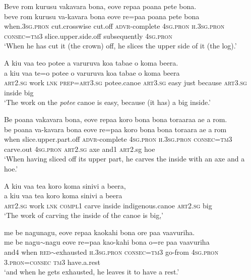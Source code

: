 \ea\label{ex:text18-9}
Beve rom kurusu vakavara bona, eove repaa poana pete bona.\\
\gll beve	rom	kurusu	va-kavara	bona	eove	re=paa	poana	pete	bona\\
     when.3\textsc{sg}.\textsc{pron}	cut.crosswise	cut.off	\textsc{advr}-complete	4\textsc{sg}.\textsc{pron}	\textsc{h}.3\textsc{sg}.\textsc{pron}	\textsc{consec}=\textsc{tm}3	slice.upper.side.off	subsequently	4\textsc{sg}.\textsc{pron}\\
\glt `When he has cut it (the crown) off, he slices the upper side of it (the log).'
\z

\ea\label{ex:text18-10}
A kiu vaa teo potee a varuruva koa tabae o koma beera.\\
\gll a	kiu	vaa	te=o	potee	o	varuruva	koa	tabae	o	koma	beera\\
     \textsc{art}2.\textsc{sg}	work	\textsc{lnk}	\textsc{prep}=\textsc{art}3.\textsc{sg}	potee.canoe	\textsc{art}3.\textsc{sg}	easy	just	because	\textsc{art}3.\textsc{sg}	inside	big\\
\glt `The work on the \textit{potee} canoe is easy, because (it has) a big inside.'
\z

\ea\label{ex:text18-11}
Be poana vakavara bona, eove repaa koro bona bona toraaraa ae a rom.\\
\gll be	poana	va-kavara	bona	eove	re=paa	koro	bona	bona	toraara	ae	a	rom\\
     when	slice.upper.part.off	\textsc{advr}-complete	4\textsc{sg}.\textsc{pron}	\textsc{h}.3\textsc{sg}.\textsc{pron}	\textsc{consec}=\textsc{tm}3	carve.out	4\textsc{sg}.\textsc{pron}	\textsc{art}2.\textsc{sg}	axe	and1	\textsc{art}2.sg	hoe\\
\glt `When having sliced off its upper part, he carves the inside with an axe and a hoe.'
\z

\ea\label{ex:text18-12}
A kiu vaa tea koro koma sinivi a beera,\\
\gll a	kiu	vaa	tea	koro	koma	sinivi	a	beera\\
     \textsc{art}2.\textsc{sg}	work	\textsc{lnk}	\textsc{compl}1	carve	inside	indigenous.canoe	\textsc{art}2.\textsc{sg}	big\\
\glt `The work of carving the inside of the canoe is big,'
\z

\ea\label{ex:text18-13}
me be nagunagu, eove repaa kaokahi bona ore paa vaavuriha.\\
\gll me	be	nagu{$\sim$}nagu	eove	re=paa	kao-kahi	bona	o=re	paa	vaavuriha\\
     and4	when	\textsc{red}{$\sim$}exhausted	\textsc{h}.3\textsc{sg}.\textsc{pron}	\textsc{consec}=\textsc{tm}3	go-from	4\textsc{sg}.\textsc{pron}	3.\textsc{pron}=\textsc{consec}	\textsc{tm}3	have.a.rest\\
\glt `and when he gets exhausted, he leaves it to have a rest.'
\z

